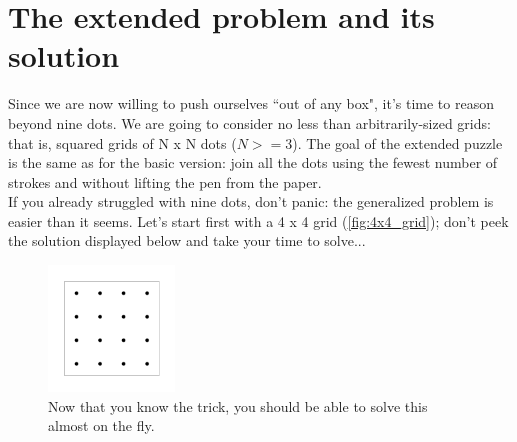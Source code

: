\documentclass[11pt]{article}
\begin{document}
\hypertarget{the-extended-problem-and-its-solution} {
	\section{The extended problem and its solution}
	\label{the-extended-problem-and-its-solution}
}

Since we are now willing to push ourselves ``out of any box", it's time to reason beyond nine dots. We are going to consider no less than arbitrarily-sized grids: that is, squared grids of N x N dots ($N >=3$). The goal of the extended puzzle is the same as for the basic version: join all the dots using the fewest number of strokes and without lifting the pen from the paper.\\
If you already struggled with nine dots, don't panic: the generalized problem is easier than it seems. Let's start first with a 4 x 4 grid (\autoref{fig:4x4_grid}); don't peek the solution displayed below and take your time to solve...
\begin{figure}[H]
\centering
\includegraphics[width=0.3\textwidth]{images/4x4_grid.png}
\caption{Now that you know the trick, you should be able to solve this almost on the fly.}
\label{fig:4x4_grid}
\end{figure}
\end{document}
